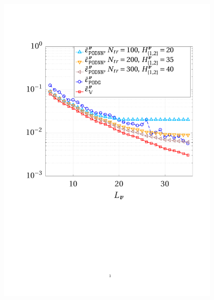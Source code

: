 \documentclass[longtitle]{elsarticle}
\numberwithin{equation}{section}
\theoremstyle{theorem}
\theoremstyle{definition}
\theoremstyle{remark}
\theoremstyle{proposition}
\numberwithin{figure}{section}
\begin{document}
\begin{figure}[t!]
			\includegraphics[scale = 0.37, trim = {2cm 9cm 1.5cm 3.5cm}, clip]{dc_400_vel_error_vs_rank_ter}
			\hspace*{1cm}

\end{figure}
\end{document}
